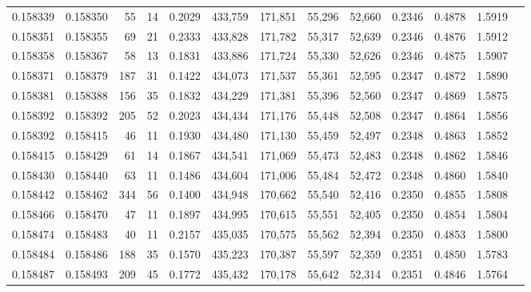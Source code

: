 \begin{tabular}{rrrrrrrrrrrrr}
0.158339 & 0.158350 &    55 &  14 &                                     0.2029 & 433,759 & 171,851 &  55,296 &  52,660 & 0.2346 & 0.4878 & 1.5919 \\
0.158351 & 0.158355 &    69 &  21 &                                     0.2333 & 433,828 & 171,782 &  55,317 &  52,639 & 0.2346 & 0.4876 & 1.5912 \\
0.158358 & 0.158367 &    58 &  13 &                                     0.1831 & 433,886 & 171,724 &  55,330 &  52,626 & 0.2346 & 0.4875 & 1.5907 \\
0.158371 & 0.158379 &   187 &  31 &                                     0.1422 & 434,073 & 171,537 &  55,361 &  52,595 & 0.2347 & 0.4872 & 1.5890 \\
0.158381 & 0.158388 &   156 &  35 &                                     0.1832 & 434,229 & 171,381 &  55,396 &  52,560 & 0.2347 & 0.4869 & 1.5875 \\
0.158392 & 0.158392 &   205 &  52 &                                     0.2023 & 434,434 & 171,176 &  55,448 &  52,508 & 0.2347 & 0.4864 & 1.5856 \\
0.158392 & 0.158415 &    46 &  11 &                                     0.1930 & 434,480 & 171,130 &  55,459 &  52,497 & 0.2348 & 0.4863 & 1.5852 \\
0.158415 & 0.158429 &    61 &  14 &                                     0.1867 & 434,541 & 171,069 &  55,473 &  52,483 & 0.2348 & 0.4862 & 1.5846 \\
0.158430 & 0.158440 &    63 &  11 &                                     0.1486 & 434,604 & 171,006 &  55,484 &  52,472 & 0.2348 & 0.4860 & 1.5840 \\
0.158442 & 0.158462 &   344 &  56 &                                     0.1400 & 434,948 & 170,662 &  55,540 &  52,416 & 0.2350 & 0.4855 & 1.5808 \\
0.158466 & 0.158470 &    47 &  11 &                                     0.1897 & 434,995 & 170,615 &  55,551 &  52,405 & 0.2350 & 0.4854 & 1.5804 \\
0.158474 & 0.158483 &    40 &  11 &                                     0.2157 & 435,035 & 170,575 &  55,562 &  52,394 & 0.2350 & 0.4853 & 1.5800 \\
0.158484 & 0.158486 &   188 &  35 &                                     0.1570 & 435,223 & 170,387 &  55,597 &  52,359 & 0.2351 & 0.4850 & 1.5783 \\
0.158487 & 0.158493 &   209 &  45 &                                     0.1772 & 435,432 & 170,178 &  55,642 &  52,314 & 0.2351 & 0.4846 & 1.5764 \\

\end{tabular}
